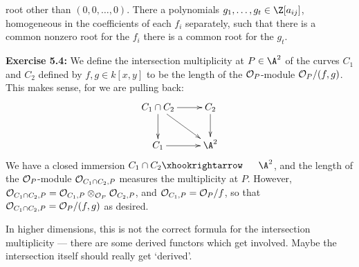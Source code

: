 \documentclass[11pt]{article}
\begin{document}
\begin{I.5 Nonsingular Varieties}
\begin{itemise}
root other than $(0,0,\ldots,0)$. There a polynomials
$g_1,\ldots,g_t\in\Z[a_{ij}]$, homogeneous in the coefficients of each $f_i$
separately, such that there is a common nonzero root for the $f_i$ \Iff there is
a common root for the $g_t$.
\item \textbf{Exercise 5.4:} We define the intersection multiplicity at $P\in\A^2$ of the curves $C_1$ and $C_2$ defined by $f,g\in k[x,y]$ to be the length of the $\mathcal{O}_P$-module $\mathcal{O}_P/(f,g)$. This makes sense, for we are pulling back:
\[\xymatrix{
C_1\cap C_2\ar[r]\ar[d]\ar[rd]&C_2\ar[d]\\
C_1\ar[r]&\A^2
}\]
We have a closed immersion $C_1\cap C_2\cofibration \A^2$, and the length of the $\mathcal{O}_P$-module $\mathcal{O}_{C_1\cap C_2,P}$ measures the multiplicity at $P$. However, $\mathcal{O}_{C_1\cap C_2,P}=\mathcal{O}_{C_1,P}\otimes_{\mathcal{O}_P}\mathcal{O}_{C_2,P}$, and $\mathcal{O}_{C_1,P}=\mathcal{O}_P/f$, so that $\mathcal{O}_{C_1\cap C_2,P}=\mathcal{O}_P/(f,g)$ as desired.

\INDENT In higher dimensions, this is not the correct formula for the intersection multiplicity --- there are some derived functors which get involved. Maybe the intersection itself should really get `derived'.
\end{itemise}
\end{I.5 Nonsingular Varieties}
\end{document}
